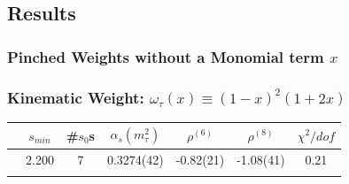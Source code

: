 \documentclass{beamer}
\begin{document}
\subsection{Results}
\subsubsection{Pinched Weights without a Monomial term \(x\)}


\begin{frame}
  \frametitle{Kinematic Weight: \(\omega_\tau(x) \equiv (1-x)^2(1+2x)\)}
  \centering
  \begin{tabular}{ccccccc}
    \toprule
    & \(s_{min}\) & \#\(s_0\)s & \(\alpha_s(m_\tau^2)\) & \(\rho^{(6)}\) & \(\rho^{(8)}\) & \(\chi^2/dof\)  \\
    \midrule
    \parbox[t]{2mm}{}
    & 2.200 & 7 & 0.3274(42) & -0.82(21) & -1.08(41) & 0.21 \\
    \midrule
    \parbox[t]{2mm}{}

\end{tabular}
\end{frame}
\end{document}
